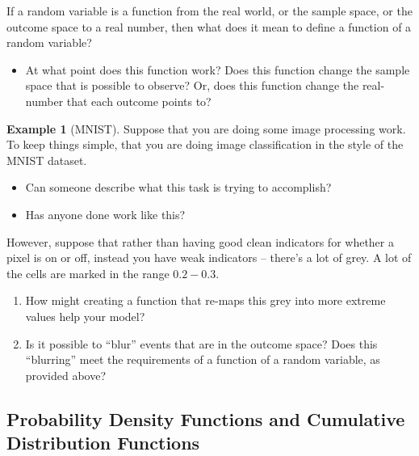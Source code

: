 \documentclass[
]{book}
\providecommand{\tightlist}{%
  \setlength{\itemsep}{0pt}\setlength{\parskip}{0pt}}
\theoremstyle{definition}
\theoremstyle{definition}
\newtheorem{example}{Example}[chapter]
\theoremstyle{definition}
\theoremstyle{definition}
\theoremstyle{remark}
\begin{document}
If a random variable is a function from the real world, or the sample space, or the outcome space to a real number, then what does it mean to define a function of a random variable?

\begin{itemize}
\tightlist
\item
  At what point does this function work? Does this function change the sample space that is possible to observe? Or, does this function change the real-number that each outcome points to?
\end{itemize}

\begin{example}[MNIST]

Suppose that you are doing some image processing work. To keep things simple, that you are doing image classification in the style of the MNIST dataset.

\begin{itemize}
\tightlist
\item
  Can someone describe what this task is trying to accomplish?
\item
  Has anyone done work like this?
\end{itemize}

However, suppose that rather than having good clean indicators for whether a pixel is on or off, instead you have weak indicators -- there's a lot of grey. A lot of the cells are marked in the range \(0.2 - 0.3\).

\begin{enumerate}
\def\labelenumi{\arabic{enumi}.}
\tightlist
\item
  How might creating a function that re-maps this grey into more extreme values help your model?
\item
  Is it possible to ``blur'' events that are in the outcome space? Does this ``blurring'' meet the requirements of a function of a random variable, as provided above?
\end{enumerate}

\end{example}

\hypertarget{probability-density-functions-and-cumulative-distribution-functions}{%
\subsection{Probability Density Functions and Cumulative Distribution Functions}\label{probability-density-functions-and-cumulative-distribution-functions}}
\end{document}
